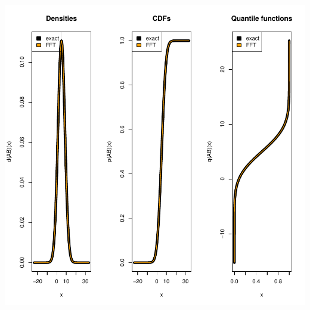 \documentclass[11pt]{article}
\begin{document}
\includegraphics{distr-ConvolutionNormalDistr}
\end{document}
